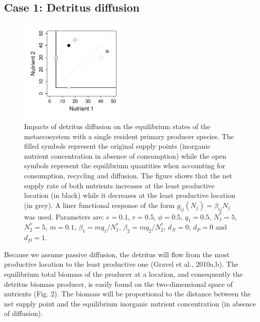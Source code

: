 \documentclass[letterpaper,twocolumn,showkeys]{revtex4-1}
\begin{document}
\subsection{Case 1: Detritus diffusion}

\begin{figure}[tb]
   \centering
   \includegraphics[width=0.45\textwidth]{DetritusDiffusion.pdf}
   \caption{Impacts of detritus diffusion on the equilibrium states of the metaecosystem with a single resident primary producer species. The filled symbols represent the original supply points (inorganic nutrient concentration in absence of consumption) while the open symbols represent the equilibrium quantities when accounting for consumption, recycling and diffusion. The figure shows that the net supply rate of both nutrients increases at the least productive location (in black) while it decreases at the least productive location (in grey). A liner functional response of the form $g_{ij}(N_{j}) = \beta_{ij}N_j$ was used. Parameters are: $e=0.1$, $r= 0.5$, $\phi=0.5$, $q_1 = 0.5$, $N^*_1=5$, $N^*_2=5$, $m =0.1$, $\beta_1 = mq_1/N^*_1$, $\beta_2 = mq_2/N^*_2$, $d_N = 0$, $d_P = 0$ and $d_D = 1$.
}
   \label{f:Detritus}
\end{figure}

Because we assume passive diffusion, the detritus will flow from the most productive location to the least productive one (Gravel et al., 2010a,b). The equilibrium total biomass of the producer at a location, and consequently the detritus biomass producer, is easily found on the two-dimensional space of nutrients (Fig. 2). The biomass will be proportional to the distance between the net supply point and the equilibrium inorganic nutrient concentration (in absence of diffusion). 
\end{document}
